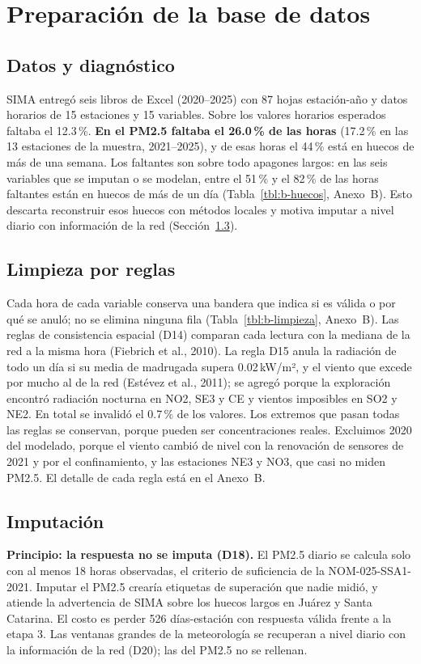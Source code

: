 \section{Preparación de la base de datos}\label{sec:preparacion}

\subsection{Datos y diagnóstico}\label{sec:datos}
SIMA entregó seis libros de Excel (2020–2025) con 87 hojas estación-año y datos horarios de 15 estaciones y 15 variables. Sobre los valores horarios esperados faltaba el 12.3\,\%. \textbf{En el PM2.5 faltaba el 26.0\,\% de las horas} (17.2\,\% en las 13 estaciones de la muestra, 2021–2025), y de esas horas el 44\,\% está en huecos de más de una semana. Los faltantes son sobre todo apagones largos: en las seis variables que se imputan o se modelan, entre el 51\,\% y el 82\,\% de las horas faltantes están en huecos de más de un día (Tabla~\ref{tbl:b-huecos}, Anexo~B). Esto descarta reconstruir esos huecos con métodos locales y motiva imputar a nivel diario con información de la red (Sección~\ref{sec:imputacion}).

\subsection{Limpieza por reglas}
Cada hora de cada variable conserva una bandera que indica si es válida o por qué se anuló; no se elimina ninguna fila (Tabla~\ref{tbl:b-limpieza}, Anexo~B). Las reglas de consistencia espacial (D14) comparan cada lectura con la mediana de la red a la misma hora (Fiebrich et al., 2010). La regla D15 anula la radiación de todo un día si su media de madrugada supera 0.02\,kW/m², y el viento que excede por mucho al de la red (Estévez et al., 2011); se agregó porque la exploración encontró radiación nocturna en NO2, SE3 y CE y vientos imposibles en SO2 y NE2. En total se invalidó el 0.7\,\% de los valores. Los extremos que pasan todas las reglas se conservan, porque pueden ser concentraciones reales. Excluimos 2020 del modelado, porque el viento cambió de nivel con la renovación de sensores de 2021 y por el confinamiento, y las estaciones NE3 y NO3, que casi no miden PM2.5. El detalle de cada regla está en el Anexo~B.

\subsection{Imputación}\label{sec:imputacion}
\textbf{Principio: la respuesta no se imputa (D18).} El PM2.5 diario se calcula solo con al menos 18 horas observadas, el criterio de suficiencia de la NOM-025-SSA1-2021. Imputar el PM2.5 crearía etiquetas de superación que nadie midió, y atiende la advertencia de SIMA sobre los huecos largos en Juárez y Santa Catarina. El costo es perder 526 días-estación con respuesta válida frente a la etapa 3. Las ventanas grandes de la meteorología se recuperan a nivel diario con la información de la red (D20); las del PM2.5 no se rellenan.



